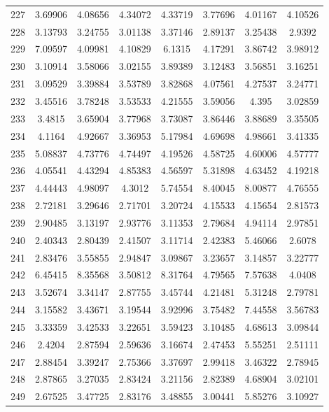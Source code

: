 \begin{center}
\begin{longtable}{cccccccc}
227 & 3.69906 & 4.08656 & 4.34072 & 4.33719 & 3.77696 & 4.01167 & 4.10526\\
228 & 3.13793 & 3.24755 & 3.01138 & 3.37146 & 2.89137 & 3.25438 & 2.9392\\
229 & 7.09597 & 4.09981 & 4.10829 & 6.1315 & 4.17291 & 3.86742 & 3.98912\\
230 & 3.10914 & 3.58066 & 3.02155 & 3.89389 & 3.12483 & 3.56851 & 3.16251\\
231 & 3.09529 & 3.39884 & 3.53789 & 3.82868 & 4.07561 & 4.27537 & 3.24771\\
232 & 3.45516 & 3.78248 & 3.53533 & 4.21555 & 3.59056 & 4.395 & 3.02859\\
233 & 3.4815 & 3.65904 & 3.77968 & 3.73087 & 3.86446 & 3.88689 & 3.35505\\
234 & 4.1164 & 4.92667 & 3.36953 & 5.17984 & 4.69698 & 4.98661 & 3.41335\\
235 & 5.08837 & 4.73776 & 4.74497 & 4.19526 & 4.58725 & 4.60006 & 4.57777\\
236 & 4.05541 & 4.43294 & 4.85383 & 4.56597 & 5.31898 & 4.63452 & 4.19218\\
237 & 4.44443 & 4.98097 & 4.3012 & 5.74554 & 8.40045 & 8.00877 & 4.76555\\
238 & 2.72181 & 3.29646 & 2.71701 & 3.20724 & 4.15533 & 4.15654 & 2.81573\\
239 & 2.90485 & 3.13197 & 2.93776 & 3.11353 & 2.79684 & 4.94114 & 2.97851\\
240 & 2.40343 & 2.80439 & 2.41507 & 3.11714 & 2.42383 & 5.46066 & 2.6078\\
241 & 2.83476 & 3.55855 & 2.94847 & 3.09867 & 3.23657 & 3.14857 & 3.22777\\
242 & 6.45415 & 8.35568 & 3.50812 & 8.31764 & 4.79565 & 7.57638 & 4.0408\\
243 & 3.52674 & 3.34147 & 2.87755 & 3.45744 & 4.21481 & 5.31248 & 2.79781\\
244 & 3.15582 & 3.43671 & 3.19544 & 3.92996 & 3.75482 & 7.44558 & 3.56783\\
245 & 3.33359 & 3.42533 & 3.22651 & 3.59423 & 3.10485 & 4.68613 & 3.09844\\
246 & 2.4204 & 2.87594 & 2.59636 & 3.16674 & 2.47453 & 5.55251 & 2.51111\\
247 & 2.88454 & 3.39247 & 2.75366 & 3.37697 & 2.99418 & 3.46322 & 2.78945\\
248 & 2.87865 & 3.27035 & 2.83424 & 3.21156 & 2.82389 & 4.68904 & 3.02101\\
249 & 2.67525 & 3.47725 & 2.83176 & 3.48855 & 3.00441 & 5.85276 & 3.10927\\

\end{longtable}
\end{center}
